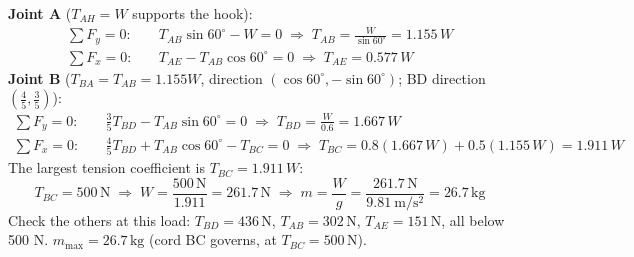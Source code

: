 \documentclass[11pt]{article}
\newcommand{\N}{\,\mathrm{N}}
\newcommand{\kg}{\,\mathrm{kg}}
\begin{document}
{\textbf{Joint A} ($T_{AH}=W$ supports the hook):
\begin{align*}
\sum F_y = 0:&\quad T_{AB}\sin60^\circ - W = 0 \;\Rightarrow\; T_{AB} = \frac{W}{\sin60^\circ} = 1.155\,W\\
\sum F_x = 0:&\quad T_{AE} - T_{AB}\cos60^\circ = 0 \;\Rightarrow\; T_{AE} = 0.577\,W
\end{align*}
\textbf{Joint B} ($T_{BA}=T_{AB}=1.155W$, direction $(\cos60^\circ,-\sin60^\circ)$; BD direction $(\tfrac45,\tfrac35)$):
\begin{align*}
\sum F_y = 0:&\quad \tfrac{3}{5}T_{BD} - T_{AB}\sin60^\circ = 0 \;\Rightarrow\; T_{BD} = \frac{W}{0.6} = 1.667\,W\\
\sum F_x = 0:&\quad \tfrac{4}{5}T_{BD} + T_{AB}\cos60^\circ - T_{BC} = 0
  \;\Rightarrow\; T_{BC} = 0.8(1.667\,W) + 0.5(1.155\,W) = 1.911\,W
\end{align*}
The largest tension coefficient is $T_{BC}=1.911\,W$:
\[
T_{BC} = 500\N \;\Rightarrow\; W = \frac{500\N}{1.911} = 261.7\N
\;\Rightarrow\; m = \frac{W}{g} = \frac{261.7\N}{9.81\ \mathrm{m/s^2}} = 26.7\kg
\]
Check the others at this load: $T_{BD}=436\N$, $T_{AB}=302\N$, $T_{AE}=151\N$, all below 500 N.
}{
$m_{\max} = 26.7\kg$ (cord BC governs, at $T_{BC}=500\N$).
}
\end{document}
